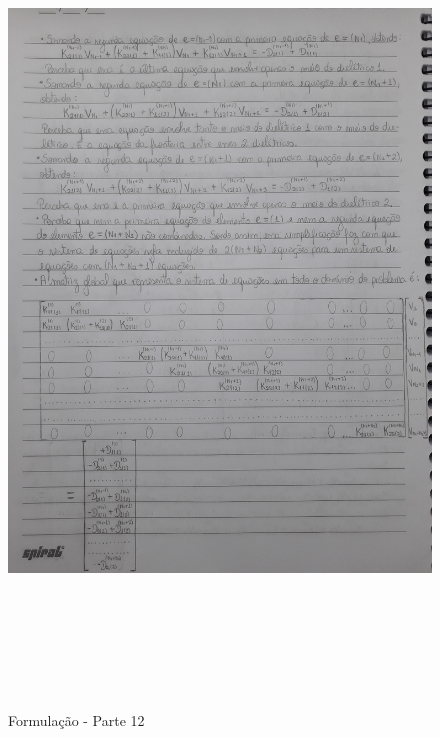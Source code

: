 \documentclass[10pt]{article}
\begin{document}
    \begin{figure}[!htb]
    \centerline{\includegraphics[width=20cm,height=22cm]{Formulação Matemática/Formulacao - Parte 12.jpg}}
    \caption{Formulação - Parte 12}
    \label{fig:fp12}
    \end{figure}
    
\end{document}
